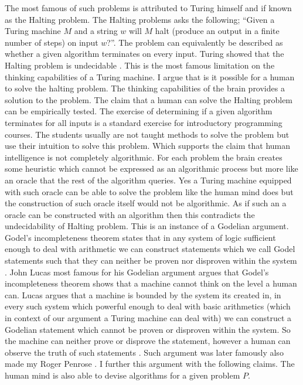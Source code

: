 \documentclass[11pt,a4paper]{article}
\begin{document}
The most famous of such problems is attributed to Turing himself and if known as the Halting problem.
The Halting problems asks the following; ``Given a Turing machine $M$ and a string $w$ will $M$ halt (produce an output in a finite number of steps) on input $w$?''. The problem can equivalently be described as whether a given algorithm terminates on every input.
Turing showed that the Halting problem is undecidable \cite{Turing36}\cite{sipser13}. This is the most famous limitation on the thinking capabilities of a Turing machine. I argue that is it possible for a human to solve the halting problem. The thinking capabilities of the brain provides a solution to the problem. The claim that a human can solve the Halting problem can be empirically tested. 
The exercise of determining if a given algorithm terminates for all inputs is a standard exercise for introductory programming courses. The students usually are not taught methods to solve the problem but use their intuition to solve this problem. Which supports the claim that human intelligence is not completely algorithmic. 
For each problem the brain creates some heuristic which cannot be expressed as an algorithmic process but more like an oracle that the rest of the algorithm queries. Yes a Turing machine equipped with such oracle can be able to solve the problem like the human mind does but the construction of such oracle itself would not be algorithmic. 
As if such an a oracle can be constructed with an algorithm then this contradicts the undecidability of Halting problem. 
This is an instance of a Godelian argument. Godel's incompleteness theorem states that in any system of logic sufficient enough to deal with arithmetic we can construct statements which we call Godel statements such that they can neither be proven nor disproven within the system \cite{Godel31}.
John Lucas most famous for his Godelian argument argues that Godel's incompleteness theorem shows that a machine cannot think on the level a human can. Lucas argues that a machine is bounded by the system its created in, in every such system which powerful enough to deal with basic arithmetics (which in context of our argument a Turing machine can deal with) we can construct a Godelian statement which cannot be proven or disproven within the system.
So the machine can neither prove or disprove the statement, however a human can observe the truth of such statements \cite{Lucas}. Such argument was later famously also made my Roger Penrose \cite{penrose}.
I further this argument with the following claims. The human mind is also able to devise algorithms for a given problem $P$. 
\end{document}
